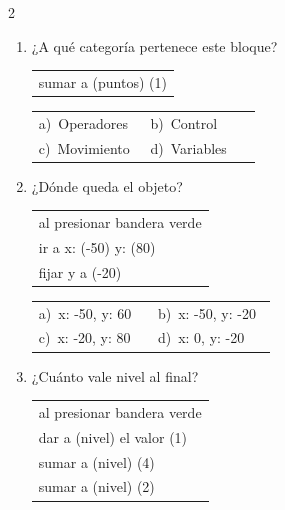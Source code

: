 \documentclass[11pt,a4paper]{article}
\begin{document}
\begin{multicols}{2}
\begin{enumerate}[label=\textbf{\arabic*.},leftmargin=*,itemsep=10pt,topsep=0pt]
\item \begin{minipage}[t]{\linewidth}
¿A qué categoría pertenece este bloque?
\par\vspace{3pt}\hspace*{1em}\begin{tabular}{@{}l@{}}\ttfamily\small sumar a (puntos) (1)
\end{tabular}\par

\vspace{4pt}
\begin{tabular}{@{}p{0.47\linewidth}p{0.47\linewidth}@{}}
a)~Operadores & b)~Control \\
c)~Movimiento & d)~Variables \\
\end{tabular}
\end{minipage}

\item \begin{minipage}[t]{\linewidth}
¿Dónde queda el objeto?
\par\vspace{3pt}\hspace*{1em}\begin{tabular}{@{}l@{}}\ttfamily\small al presionar bandera verde \\
\ttfamily\small ir a x: (-50) y: (80) \\
\ttfamily\small fijar y a (-20)
\end{tabular}\par

\vspace{4pt}
\begin{tabular}{@{}p{0.47\linewidth}p{0.47\linewidth}@{}}
a)~x: -50, y: 60 & b)~x: -50, y: -20 \\
c)~x: -20, y: 80 & d)~x: 0, y: -20 \\
\end{tabular}
\end{minipage}

\item \begin{minipage}[t]{\linewidth}
¿Cuánto vale nivel al final?
\par\vspace{3pt}\hspace*{1em}\begin{tabular}{@{}l@{}}\ttfamily\small al presionar bandera verde \\
\ttfamily\small dar a (nivel) el valor (1) \\
\ttfamily\small sumar a (nivel) (4) \\
\ttfamily\small sumar a (nivel) (2)
\end{tabular}\par


\end{minipage}
\end{enumerate}
\end{multicols}
\end{document}
